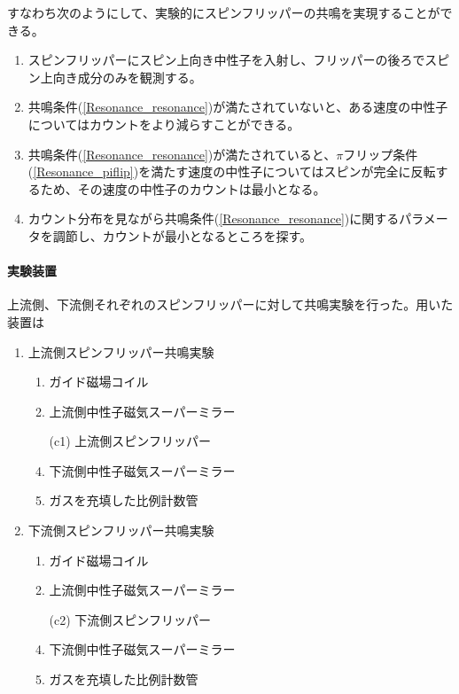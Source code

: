 すなわち次のようにして、実験的にスピンフリッパーの共鳴を実現することができる。
\begin{enumerate}
\item スピンフリッパーにスピン上向き中性子を入射し、フリッパーの後ろでスピン上向き成分のみを観測する。
\item 共鳴条件(\ref{Resonance_resonance})が満たされていないと、ある速度の中性子についてはカウントをより減らすことができる。
\item 共鳴条件(\ref{Resonance_resonance})が満たされていると、$\pi$フリップ条件(\ref{Resonance_piflip})を満たす速度の中性子についてはスピンが完全に反転するため、その速度の中性子のカウントは最小となる。
\item カウント分布を見ながら共鳴条件(\ref{Resonance_resonance})に関するパラメータを調節し、カウントが最小となるところを探す。
\end{enumerate}


\paragraph{実験装置}
上流側、下流側それぞれのスピンフリッパーに対して共鳴実験を行った。用いた装置は
\vspace{5mm}
\begin{minipage}{0.5\hsize}
\begin{enumerate}
\item 上流側スピンフリッパー共鳴実験
\begin{enumerate}
\item ガイド磁場コイル
\item 上流側中性子磁気スーパーミラー
\item[(c1)] 上流側スピンフリッパー
\setcounter{enumii}{3}
\item 下流側中性子磁気スーパーミラー
\item {}ガスを充填した比例計数管
\end{enumerate}
\end{enumerate}
\end{minipage}
\begin{minipage}{0.5\hsize}
\begin{enumerate}
\setcounter{enumi}{1}
\item 下流側スピンフリッパー共鳴実験
\begin{enumerate}
\item ガイド磁場コイル
\item 上流側中性子磁気スーパーミラー
\item[(c2)] 下流側スピンフリッパー
\setcounter{enumii}{3}
\item 下流側中性子磁気スーパーミラー
\item {}ガスを充填した比例計数管
\end{enumerate}
\end{enumerate}
\end{minipage}
\vspace{5mm}

